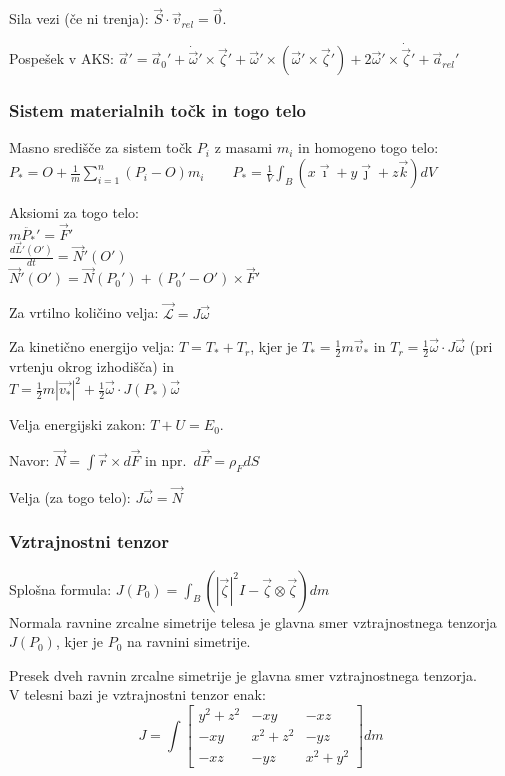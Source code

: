 \documentclass[a4paper,10pt]{article}
\theoremstyle{definition}
\newcommand{\vzeta}{\vec{\zeta}}
\newcommand{\dzeta}{\dot{\vzeta}}
\newcommand{\vomega}{\vec{\omega}}
\newcommand{\domega}{\dot{\vomega}}
\newcommand{\va}{\vec{a}}
\newcommand{\Pt}{P_{\ast}}
\begin{document}
Sila vezi (če ni trenja): $\vec{S} \cdot \vec{v}_{rel} = \vec{0}.$

Pospešek v AKS: $\va' = \va_0' + \domega' \times \vzeta' + \vomega' \times (\vomega' \times \vzeta') + 2 \vomega'\times\dzeta' + \va_{rel}'$

\subsubsection*{Sistem materialnih točk in togo telo}
Masno središče za sistem točk $P_i$ z masami $m_i$ in homogeno togo telo: \\
$ \displaystyle \Pt = O + \frac1m \sum_{i=1}^n (P_i - O) m_i \qquad \Pt =
\frac1V \int_B (x\vec{\imath} + y\vec{\jmath} + z\vec{k})dV $

Aksiomi za togo telo: \\
$m\ddot{\Pt}' = \vec{F}'$ \\
$\displaystyle \frac{d\vec{L}'(O')}{dt} = \vec{N}'(O')$ \\
$\vec{N}'(O') = \vec{N}(P_0') + (P_0' - O') \times \vec{F}'$

Za vrtilno količino velja: $\vec{\mathcal{L}} = J \vec{\omega}$

Za kinetično energijo velja:
$T = T_\ast + T_r$, kjer je $T_\ast = \frac12 m\vec{v}_\ast$ in $T_r = \frac12 \vomega \cdot J \vomega$  (pri vrtenju okrog izhodišča) in \\
$T = \frac{1}{2} m |\vec{v_*}|^2 + \frac{1}{2} \vec{\omega} \cdot J(\Pt) \vec{\omega}$

Velja energijski zakon: $T + U = E_0$.

Navor: $\vec{N} = \int \vec{r} \times d\vec{F}$ in npr.\ $d\vec{F} = \rho_F dS$

Velja (za togo telo): $J \vec{\omega} = \vec{N}$

\subsubsection*{Vztrajnostni tenzor}
Splošna formula: $J(P_0) = \int_B (|\vec{\zeta}|^2 I - \vec{\zeta} \otimes \vec{\zeta} ) dm$\\

Normala ravnine zrcalne simetrije telesa je glavna smer vztrajnostnega tenzorja $J(P_0)$, kjer je $P_0$ na ravnini simetrije.

Presek dveh ravnin zrcalne simetrije je glavna smer vztrajnostnega tenzorja.\\

V telesni bazi je vztrajnostni tenzor enak:
\[ J = \int
  \begin{bmatrix}
    y^2 + z^2 & -xy & -xz \\
    -xy & x^2 + z^2 & -yz \\
    -xz & -yz & x^2 + y^2
\end{bmatrix} dm \]
\end{document}
